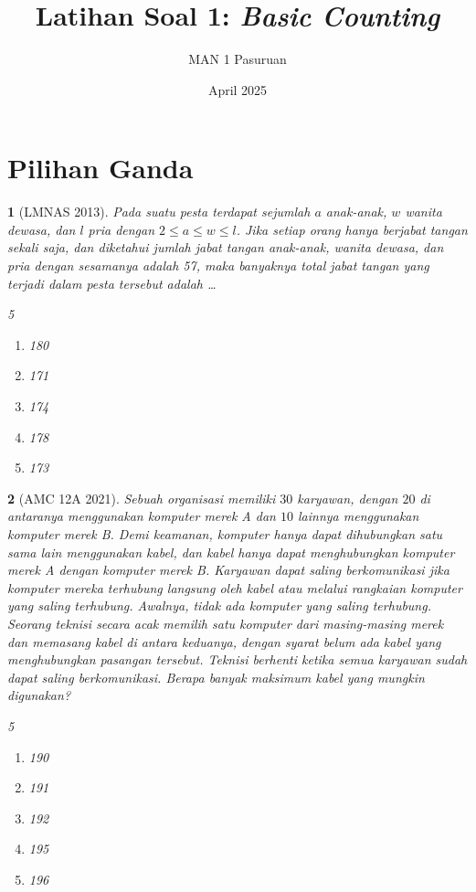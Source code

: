 \documentclass[11pt,a4paper,DIV=12]{scrartcl}
\theoremstyle{justnumber}
\newtheorem{problem}{}
\begin{document}
\title{Latihan Soal 1:
  \textit{Basic Counting}}
\author{MAN 1 Pasuruan}
\date{April 2025}
\maketitle
\section*{Pilihan Ganda}
\begin{problem}[LMNAS 2013]
  Pada suatu pesta terdapat sejumlah $a$ anak-anak, $w$ wanita dewasa, dan $l$ pria dengan $2 \leq a \leq w \leq l$. Jika setiap orang hanya berjabat tangan sekali saja, dan diketahui jumlah jabat tangan anak-anak, wanita dewasa, dan pria dengan sesamanya adalah 57, maka banyaknya total jabat tangan yang terjadi dalam pesta tersebut adalah \ldots
  \begin{multicols}{5}
    \begin{enumerate}
      \item[(a)] 180
      \item[(b)] 171
      \item[(c)] 174
      \item[(d)] 178
      \item[(e)] 173
    \end{enumerate}
  \end{multicols}
\end{problem}

\begin{problem}[AMC 12A 2021]
  Sebuah organisasi memiliki $30$ karyawan, dengan $20$ di antaranya menggunakan komputer merek A dan $10$ lainnya menggunakan komputer merek B. Demi keamanan, komputer hanya dapat dihubungkan satu sama lain menggunakan kabel, dan kabel hanya dapat menghubungkan komputer merek A dengan komputer merek B. Karyawan dapat saling berkomunikasi jika komputer mereka terhubung langsung oleh kabel atau melalui rangkaian komputer yang saling terhubung. Awalnya, tidak ada komputer yang saling terhubung. Seorang teknisi secara acak memilih satu komputer dari masing-masing merek dan memasang kabel di antara keduanya, dengan syarat belum ada kabel yang menghubungkan pasangan tersebut. Teknisi berhenti ketika semua karyawan sudah dapat saling berkomunikasi. Berapa banyak maksimum kabel yang mungkin digunakan?

  \begin{multicols}{5}
    \begin{enumerate}
      \item[(A)] 190
      \item[(B)] 191
      \item[(C)] 192
      \item[(D)] 195
      \item[(E)] 196
    \end{enumerate}
  \end{multicols}
\end{problem}
\end{document}
